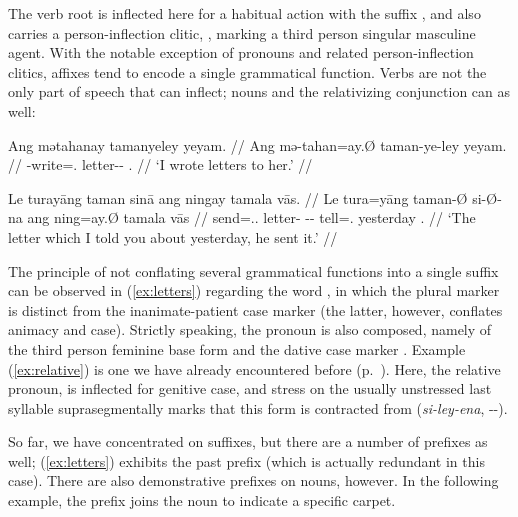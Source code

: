 The verb root  is inflected here for a habitual action 
with the suffix , and also carries a person-inflection 
clitic, , marking a third person singular 
masculine agent. With the notable exception of pronouns and related 
person-inflection clitics, affixes tend to encode a single grammatical function. 
Verbs are not the only part of speech that can inflect; nouns and the 
relativizing conjunction can as well:

\pex
\a\label{ex:letters}\begingl
	\gla Ang mətahanay tamanyeley yeyam. //
	\glb Ang mə-tahan=ay.Ø taman-ye-ley yeyam. //
	\glc \AgtT{} \Pst{}-write=\Fsg{}.\Top{} letter-\Pl{}-\PargI{} 
		\TsgF{}.\Dat{} //
	\glft `I wrote letters to her.' //
\endgl

\a\label{ex:relative}\begingl
	\gla Le turayāng taman sinā ang ningay tamala vās. //
	\glb Le tura=yāng taman-Ø si-Ø-na ang ning=ay.Ø tamala vās //
	\glc \PatTI{} send=\Tsg{}.\M{}.\Aarg{} letter-\Top{} 
		\Rel{}-\PatTI{}-\Gen{} \AgtT{} tell=\Fsg{}.\Top{} yesterday 
		\Ssg{}.\Parg{} //
	\glft `The letter which I told you about yesterday, he sent it.' //
\endgl
\xe

The principle of not conflating several grammatical functions into a single 
suffix can be observed in (\ref{ex:letters}) regarding the word 
, in which the plural marker 
 is distinct from the inanimate-patient case marker 
 (the latter, however, conflates animacy and case). Strictly 
speaking, the pronoun  is also composed, namely of 
the third person feminine base form  and the dative case marker 
. Example (\ref{ex:relative}) is one we have already encountered 
before (p.~\pageref{doublerel}). Here, the relative pronoun, 
 is inflected for genitive case, and 
stress on the usually unstressed last syllable 
suprasegmentally marks that this form is contracted from 
 (\textit{si-ley-ena}, \Rel{}-\PargI{}-\Gen{}).

So far, we have concentrated on suffixes, but there are a number of 
prefixes as well; (\ref{ex:letters}) exhibits the past prefix 
 (which is actually redundant in this case). There are also 
demonstrative prefixes on nouns, however. In the following example, the prefix 
 joins the noun  to indicate a 
specific carpet.

